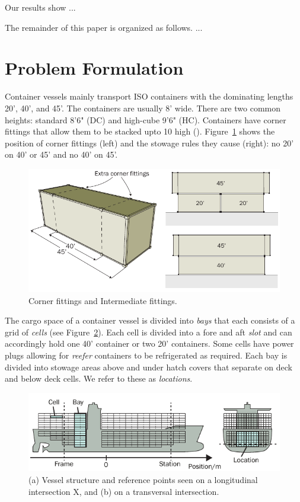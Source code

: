 \documentclass[runningheads]{llncs}
\begin{document}
Our results show ...

The remainder of this paper is organized as follows. ...

\section{Problem Formulation}

Container vessels mainly transport ISO containers with the dominating lengths 20', 40', and 45'. The containers are usually 8' wide. There are two common heights: standard 8'6" (DC) and high-cube 9'6" (HC). Containers have corner fittings that allow them to be stacked upto 10 high (). Figure~\ref{fig:container_intermediate_fittings} shows the position of corner fittings (left) and the stowage rules they cause (right): no 20' on 40' or 45' and no 40' on 45'.      
\begin{figure}[h!]
\centering \includegraphics[scale=0.7]{figures/2_3}
\caption{Corner fittings and Intermediate fittings.\label{fig:container_intermediate_fittings}}
\end{figure}
The cargo space of a container vessel is divided into \textit{bays} that each consists of a grid of \emph{cells} (see Figure~\ref{fig:vessel}). Each cell is divided into a fore and aft \emph{slot} and can accordingly hold one 40' container or two 20' containers. Some cells have power plugs allowing for \emph{reefer} containers to be refrigerated as required. Each bay is divided into stowage areas above and under hatch covers that separate on deck and below deck cells. We refer to these as {\em locations}.
\begin{figure}[h!]
	\centering
		\includegraphics{figures/vessel2.pdf}
	\caption{(a) Vessel structure and reference points seen on a longitudinal intersection X, and (b) on a transversal intersection.}
	\label{fig:vessel}
\end{figure}
\end{document}
